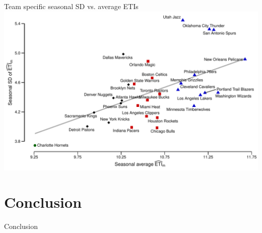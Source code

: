 \documentclass[ignorenonframetext,xcolor=pdflatex,table,dvipsnames,serif]{beamer}
\begin{document}
\begin{frame}{Team specific seasonal SD vs. average ETIs}
\includegraphics[scale=0.5]{fig5.pdf}
\end{frame}

\section{Conclusion}

\begin{frame}{Conclusion}
\end{frame}
\end{document}
